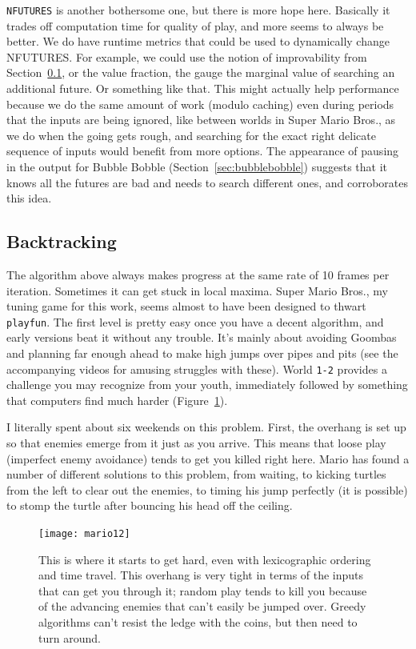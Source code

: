 \documentclass[twocolumn]{article}
\begin{document}
{  {\tt NFUTURES} is another bothersome one, but there is more hope here.
  Basically it trades off computation time for quality of play, and
  more seems to always be better. We do have runtime metrics that could
  be used to dynamically change NFUTURES. For example, we could use
  the notion of improvability from Section~\ref{sec:backtracking}, or
  the value fraction, the gauge the marginal value of searching an
  additional future. Or something like that. This might actually help
  performance because we do the same amount of work (modulo caching)
  even during periods that the inputs are being ignored, like between
  worlds in Super Mario Bros., as we do when the going gets rough,
  and searching for the exact right delicate sequence of inputs would
  benefit from more options. The appearance of pausing in the output
  for Bubble Bobble (Section~\ref{sec:bubblebobble}) suggests that it
  knows all the futures are bad and needs to search different ones,
  and corroborates this idea.}

\subsection{Backtracking} \label{sec:backtracking}

The algorithm above always makes progress at the same rate of 10
frames per iteration. Sometimes it can get stuck in local maxima.
Super Mario Bros., my tuning game for this work, seems almost to have
been designed to thwart {\tt playfun}. The first level is pretty easy
once you have a decent algorithm, and early versions beat it without
any trouble. It's mainly about avoiding Goombas and planning far
enough ahead to make high jumps over pipes and pits (see the
accompanying videos for amusing struggles with these). World {\tt 1-2}
provides a challenge you may recognize from your youth, immediately
followed by something that computers find much harder
(Figure~\ref{fig:mario12}).

I literally spent about six weekends on this problem. First, the
overhang is set up so that enemies emerge from it just as you arrive.
This means that loose play (imperfect enemy avoidance) tends to get
you killed right here. Mario has found a number of different solutions
to this problem, from waiting, to kicking turtles from the left to
clear out the enemies, to timing his jump perfectly (it is possible)
to stomp the turtle after bouncing his head off the ceiling.


\begin{figure}[h!tb]
\begin{center}
\texttt{[image: mario12]}
\end{center}\vspace{-0.1in}
\caption{This is where it starts to get hard, even with lexicographic
ordering and time travel. This overhang is very tight in terms of the
inputs that can get you through it; random play tends to kill you because
of the advancing enemies that can't easily be jumped over. Greedy
algorithms can't resist the ledge with the coins, but then need to
turn around.}
\label{fig:mario12}
\end{figure}
\end{document}
